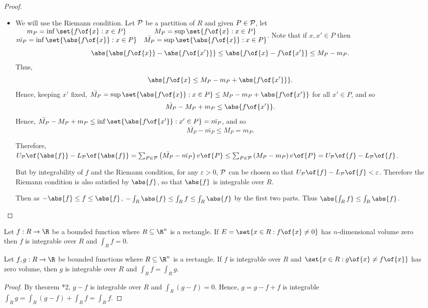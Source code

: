 \begin{proof}
    \begin{itemize}
        \item We will use the Riemann condition. Let $\cal{P}$ be a partition of $R$ and given $P \in \cal{P}$, let $\begin{matrix}
            m_P = \inf{\set{f\of{x}: x \in P}} & M_P = \sup{\set{f\of{x}: x \in P}} \\
            \bar{m_P} = \inf \set{\abs{f\of{x}}: x \in P} & \bar{M_P} = \sup \set{\abs{f\of{x}}: x \in P}
        \end{matrix}$. Note that if $x, x' \in P$ then
        \[\abs{\abs{f\of{x}} - \abs{f\of{x'}}} \leq \abs{f\of{x} - f\of{x'}} \leq M_P - m_P.\]
        Thus, \[\abs{f\of{x} \leq M_P - m_P + \abs{f\of{x'}}}.\]
        Hence, keeping $x'$ fixed, $\bar{M_P} = \sup \set{\abs{f\of{x}}: x \in P} \leq M_P - m_P + \abs{f\of{x'}}$ for all $x' \in P$, and so \[\bar{M_P} - M_P + m_P \leq \abs{f\of{x'}}.\]
        Hence, $\bar{M_P} - M_P + m_P \leq \inf \set{\abs{f\of{x'}}: x' \in P} = \bar{m_P}$,
        and so \[\bar{M_P} - \bar{m_P} \leq M_P = m_P.\]

        Therefore, $U_{\cal{P}}\of{\abs{f}} - L_{\cal{P}}\of{\abs{f}} = \sum_{P \in \cal{P}} \left(\bar{M_P} - \bar{m_P}\right) v\of{P} \leq \sum_{P \in \cal{P}} \left(M_P - m_P\right) v\of{P} = U_{\cal{P}}\of{f} - L_{\cal{P}}\of{f}$.

        But by integrability of $f$ and the Riemann condition, for any $\varepsilon > 0$, $\cal{P}$ can be chosen so that $U_{\cal{P}}\of{f} - L_{\cal{P}}\of{f} < \varepsilon$. Therefore the Riemann condition is also satisfied by $\abs{f}$, so that $\abs{f}$ is integrable over $R$.

        Then as $- \abs{f} \leq f \leq \abs{f}$, $-\int_R \abs{f} \leq \int_R f \leq \int_R \abs{f}$ by the first two parts. Thus $\abs{\int_R f} \leq \int_R \abs{f}$.
    \end{itemize}
\end{proof}

\begin{theorem}[*2]
    Let $f: R \to \R$ be a bounded function where $R \subseteq \R^n$ is a rectangle. If $E = \set{x \in R: f\of{x} \neq 0}$ has $n$-dimensional volume zero then $f$ is integrable over $R$ and $\int_R f = 0$. 
\end{theorem}

\begin{corollary}[*3]
    Let $f,g: R \to \R$ be bounded functions where $R \subseteq \R^n$ is a rectangle. If $f$ is integrable over $R$ and $\set{x \in R: g\of{x} \neq f\of{x}}$ has zero volume, then $g$ is integrable over $R$ and $\int_R f = \int_R g$.
\end{corollary}
\begin{proof}
    By theorem *2, $g-f$ is integrable over $R$ and $\int_R \left(g - f\right) = 0$. Hence, $g = g - f + f$ is integrable $\int_R g = \int_R \left(g - f\right) + \int_R f = \int_R f$.
\end{proof}

